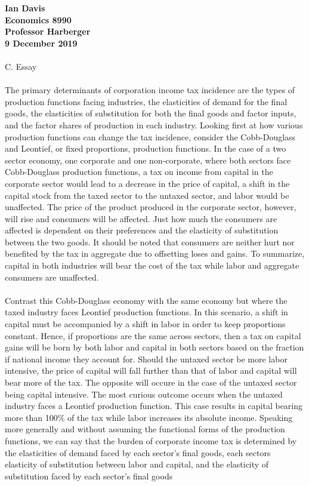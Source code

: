 
\let\counterwithout\relax
\let\counterwithin\relax
{}
\usepackage{listings}


\noindent \textbf{Ian Davis}\\
\noindent \textbf{Economics 8990}\\
\noindent \textbf{Professor Harberger}\\
\noindent \textbf{9 December 2019}\\
\\
C. Essay\\
\\
\indent The primary determinants of corporation income tax incidence are the types of production functions facing industries, the elasticities of demand for the final goods, the elasticities of substitution for both the final goods and factor inputs, and the factor shares of production in each industry. Looking first at how various production functions can change the tax incidence, consider the Cobb-Douglass and Leontief, or fixed proportions, production functions. In the case of a two sector economy, one corporate and one non-corporate, where both sectors face Cobb-Douglass production functions, a tax on income from capital in the corporate sector would lead to a decrease in the price of capital, a shift in the capital stock from the taxed sector to the untaxed sector, and labor would be unaffected. The price of the product produced in the corporate sector, however, will rise and consumers will be affected. Just how much the consumers are affected is dependent on their preferences and the elasticity of substitution between the two goods. It should be noted that consumers are neither hurt nor benefited by the tax in aggregate due to offsetting loses and gains. To summarize, capital in both industries will bear the cost of the tax while labor and aggregate consumers are unaffected.\\
\\
\indent Contrast this Cobb-Douglass economy with the same economy but where the taxed industry faces Leontief production functions. In this scenario, a shift in capital must be accompanied by a shift in labor in order to keep proportions constant. Hence, if proportions are the same across sectors, then a tax on capital gains will be born by both labor and capital in both sectors based on the fraction if national income they account for. Should the untaxed sector be more labor intensive, the price of capital will fall further than that of labor and capital will bear more of the tax. The opposite will occure in the case of the untaxed sector being capital intensive. The most curious outcome occurs when the untaxed industry faces a Leontief production function. This case results in capital bearing more than 100\% of the tax while labor increases its absolute income. Speaking more generally and without assuming the functional forms of the production functions, we can say that the burden of corporate income tax is determined by the elasticities of demand faced by each sector's final goods, each sectors elasticity of substitution between labor and capital, and the elasticity of substitution faced by each sector's final goods\\
